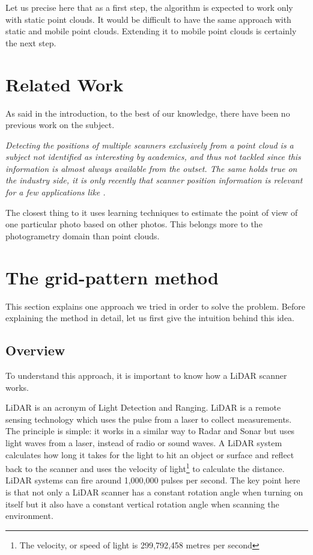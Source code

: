 Let us precise here that as a first step, the algorithm is expected to work only with static point clouds. It would be difficult to have the same approach with static and mobile point clouds. Extending it to mobile point clouds is certainly the next step.

\section{Related Work}
As said in the introduction, to the best of our knowledge, there have been no previous work on the subject.

\emph{Detecting the positions of multiple scanners exclusively from a point cloud is a subject not identified as interesting by academics, and thus not tackled since this information is almost always available from the outset. The same holds true on the industry side, it is only recently that scanner position information is relevant for a few applications like \CC.}

The closest thing to it uses learning techniques to estimate the point of view of one particular photo based on other photos. This belongs more to the photogrametry domain than point clouds.


\section{The grid-pattern method}
This section explains one approach we tried in order to solve the problem. Before explaining the method in detail, let us first give the intuition behind this idea.

\subsection{Overview}
To understand this approach, it is important to know how a LiDAR scanner works.

LiDAR is an acronym of Light Detection and Ranging. LiDAR is a remote sensing technology which uses the pulse from a laser to collect measurements. The principle is simple: it works in a similar way to Radar and Sonar but uses light waves from a laser, instead of radio or sound waves. A LiDAR system calculates how long it takes for the light to hit an object or surface and reflect back to the scanner and uses the velocity of light\footnote{The velocity, or speed of light is 299,792,458 metres
per second} to calculate the distance. LiDAR systems can fire around 1,000,000 pulses per second. The key point here is that not only a LiDAR scanner has a constant rotation angle when turning on itself but it also have a constant vertical rotation angle when scanning the environment.

